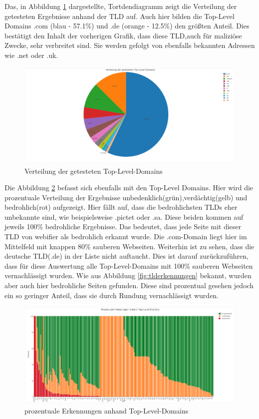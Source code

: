Das, in Abbildung \ref{fig:tldverteilung} dargestellte, Tortdendiagramm zeigt die Verteilung der getesteten Ergebnisse anhand der \ac{TLD} auf. Auch hier bilden die Top-Level Domains .com (blau - 57.1\%) und .de (orange - 12.5\%) den größten Anteil. Dies bestätigt den Inhalt der vorherigen Grafik, dass diese \ac{TLD},auch für maliziöse Zwecke, sehr verbreitet sind. Sie werden gefolgt von ebenfalls bekannten Adressen wie .net oder .uk.
\begin{figure}[H]
  \centering
  \includegraphics[width=15cm]{images/stats/tldverteilung}
  \caption{Verteilung der getesteten Top-Level-Domains}
  \label{fig:tldverteilung}
\end{figure}

Die Abbildung \ref{fig:tldprozentual} befasst sich ebenfalls mit den Top-Level Domains. Hier wird die prozentuale Verteilung der Ergebnisse unbedenklich(grün),verdächtig(gelb) und bedrohlich(rot) aufgezeigt. Hier fällt auf, dass die bedrohlichsten \ac{TLD}s eher unbekannte sind, wie beispielsweise .pictet oder .sa. Diese beiden kommen auf jeweils 100\% bedrohliche Ergebnisse. Das bedeutet, dass jede Seite mit dieser \ac{TLD} von webifier als bedrohlich erkannt wurde. Die .com-Domain liegt hier im Mittelfeld mit knappen 80\% sauberen Webseiten. Weiterhin ist zu sehen, dass die deutsche \ac{TLD}(.de) in der Liste nicht auftaucht. Dies ist darauf zurückzuführen, dass für diese Auswertung alle Top-Level-Domains mit 100\% sauberen Webseiten vernachlässigt wurden. Wie aus Abbildung \ref{fig:tlderkennungen} bekannt, wurden aber auch hier bedrohliche Seiten gefunden. Diese sind prozentual gesehen jedoch ein so geringer Anteil, dass sie durch Rundung vernachlässigt wurden.
\begin{figure}[H]
  \centering
  \includegraphics[width=15cm]{images/stats/tldprozentual}
  \caption{prozentuale Erkennungen anhand Top-Level-Domains}
  \label{fig:tldprozentual}
\end{figure}

